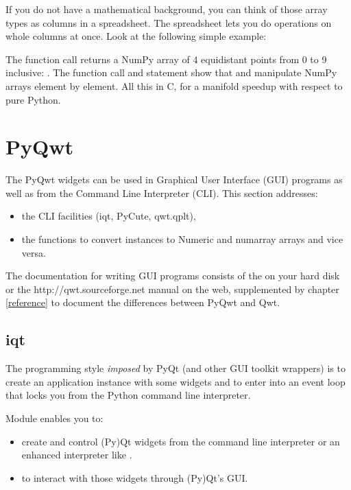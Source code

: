 \documentclass{manual}
\newcommand{\Qwt}{\ulink{Qwt}
  {http://qwt.sourceforge.net}}
\begin{document}
If you do not have a mathematical background, you can think of those array
types as columns in a spreadsheet.  The spreadsheet lets you do operations
on whole columns at once.  Look at the following simple example:



The function call  returns a NumPy array of 4
equidistant points from 0 to 9 inclusive: .
The function call  and statement  show that
 and \samp{*} manipulate NumPy arrays element by element.
All this in C, for a manifold speedup with respect to pure Python.


\section{PyQwt \label{pyqwt-intro}}

The PyQwt widgets can be used in Graphical User Interface (GUI)
programs as well as from the Command Line Interpreter (CLI).
This section addresses:
\begin{itemize}
\item
  the CLI facilities (iqt, PyCute, qwt.qplt),
\item
  the functions to convert  instances to Numeric and numarray
  arrays and vice versa.
\end{itemize}

The documentation for writing GUI programs consists of the
 on your hard disk or the \Qwt{} manual on
the web, supplemented by chapter \ref{reference} to document the differences
between PyQwt and Qwt.

\subsection{iqt \label{iqt-intro}}

The programming style \emph{imposed} by PyQt (and other GUI toolkit wrappers)
is to create an application instance with some widgets and to enter into an
event loop that locks you from the Python command line interpreter.

Module  enables you to:
\begin{itemize}
\item
  create and control (Py)Qt widgets from the command line interpreter or an
  enhanced interpreter like .
\item
  to interact with those widgets through (Py)Qt's GUI.
\end{itemize}
\end{document}
